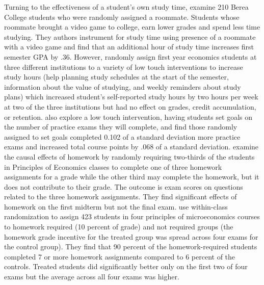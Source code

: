\documentclass[12pt]{article}
\begin{document}
Turning to the effectiveness of a student's own study time, \textcite{ss2008} examine 210 Berea College students who were randomly assigned a roommate. Students whose roommate brought a video game to college, earn lower grades and spend less time studying. They authors instrument for study time using presence of a roommate with a video game and find that an additional hour of study time increases first semester GPA by .36. However, \textcite{oppp2019} randomly assign first year economics students at three different institutions to a variety of low touch interventions to increase study hours (help planning study schedules at the start of the semester, information about the value of studying, and weekly reminders about study plans) which increased student's self-reported study hours by two hours per week at two of the three institutions but had no effect on grades, credit accumulation, or retention. \textcite{cgpr2020} also explore a low touch intervention, having students set goals on the number of practice exams they will complete, and find those randomly assigned to set goals completed 0.102 of a standard deviation more practice exams and increased total course points by .068 of a standard deviation. \textcite{ts2012} examine the causal effects of homework by randomly requiring two-thirds of the students in Principles of Economics classes to complete one of three homework assignments for a grade while the other third may complete the homework, but it does not contribute to their grade. The outcome is exam scores on questions related to the three homework assignments. They find significant effects of homework on the first midterm but not the final exam. \textcite{gr2013} use within-class randomization to assign 423 students in four principles of microeconomics courses to homework required (10 percent of grade) and not required groups (the homework grade incentive for the treated group was spread across four exams for the control group). They find that 90 percent of the homework-required students completed 7 or more homework assignments compared to 6 percent of the controls. Treated students did significantly better only on the first two of four exams but the average across all four exams was higher.
\end{document}

